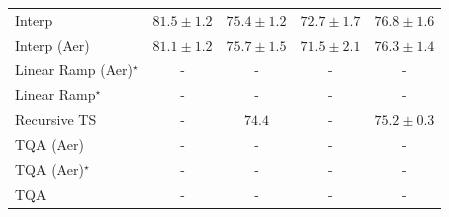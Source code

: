 \begin{tabular}{l|cccc|}
Interp & {\cellcolor[HTML]{782A05}} \color[HTML]{F1F1F1} $81.5\pm 1.2$ & {\cellcolor[HTML]{FEBB47}} \color[HTML]{000000} $75.4\pm 1.2$ & {\cellcolor[HTML]{FFF3B2}} \color[HTML]{000000} $72.7\pm 1.7$ & {\cellcolor[HTML]{FA9125}} \color[HTML]{F1F1F1} $76.8\pm 1.6$ \\
Interp (Aer) & {\cellcolor[HTML]{862E05}} \color[HTML]{F1F1F1} $81.1\pm 1.2$ & {\cellcolor[HTML]{FEB23F}} \color[HTML]{000000} $75.7\pm 1.5$ & {\cellcolor[HTML]{FFFCD7}} \color[HTML]{000000} $71.5\pm 2.1$ & {\cellcolor[HTML]{FE9F2E}} \color[HTML]{000000} $76.3\pm 1.4$ \\
Linear Ramp (Aer)$^\star$ & {\cellcolor[HTML]{000000}} \color[HTML]{F1F1F1} {\cellcolor{white}} \color{black} - & {\cellcolor[HTML]{000000}} \color[HTML]{F1F1F1} {\cellcolor{white}} \color{black} - & {\cellcolor[HTML]{000000}} \color[HTML]{F1F1F1} {\cellcolor{white}} \color{black} - & {\cellcolor[HTML]{000000}} \color[HTML]{F1F1F1} {\cellcolor{white}} \color{black} - \\
Linear Ramp$^\star$ & {\cellcolor[HTML]{000000}} \color[HTML]{F1F1F1} {\cellcolor{white}} \color{black} - & {\cellcolor[HTML]{000000}} \color[HTML]{F1F1F1} {\cellcolor{white}} \color{black} - & {\cellcolor[HTML]{000000}} \color[HTML]{F1F1F1} {\cellcolor{white}} \color{black} - & {\cellcolor[HTML]{000000}} \color[HTML]{F1F1F1} {\cellcolor{white}} \color{black} - \\
Recursive TS & {\cellcolor[HTML]{000000}} \color[HTML]{F1F1F1} {\cellcolor{white}} \color{black} - & {\cellcolor[HTML]{FED471}} \color[HTML]{000000} $74.4$ & {\cellcolor[HTML]{000000}} \color[HTML]{F1F1F1} {\cellcolor{white}} \color{black} - & {\cellcolor[HTML]{FEC24D}} \color[HTML]{000000} $75.2\pm 0.3$ \\
TQA (Aer) & {\cellcolor[HTML]{000000}} \color[HTML]{F1F1F1} {\cellcolor{white}} \color{black} - & {\cellcolor[HTML]{000000}} \color[HTML]{F1F1F1} {\cellcolor{white}} \color{black} - & {\cellcolor[HTML]{000000}} \color[HTML]{F1F1F1} {\cellcolor{white}} \color{black} - & {\cellcolor[HTML]{000000}} \color[HTML]{F1F1F1} {\cellcolor{white}} \color{black} - \\
TQA (Aer)$^\star$ & {\cellcolor[HTML]{000000}} \color[HTML]{F1F1F1} {\cellcolor{white}} \color{black} - & {\cellcolor[HTML]{000000}} \color[HTML]{F1F1F1} {\cellcolor{white}} \color{black} - & {\cellcolor[HTML]{000000}} \color[HTML]{F1F1F1} {\cellcolor{white}} \color{black} - & {\cellcolor[HTML]{000000}} \color[HTML]{F1F1F1} {\cellcolor{white}} \color{black} - \\
TQA & {\cellcolor[HTML]{000000}} \color[HTML]{F1F1F1} {\cellcolor{white}} \color{black} - & {\cellcolor[HTML]{000000}} \color[HTML]{F1F1F1} {\cellcolor{white}} \color{black} - & {\cellcolor[HTML]{000000}} \color[HTML]{F1F1F1} {\cellcolor{white}} \color{black} - & {\cellcolor[HTML]{000000}} \color[HTML]{F1F1F1} {\cellcolor{white}} \color{black} - \\

\end{tabular}
